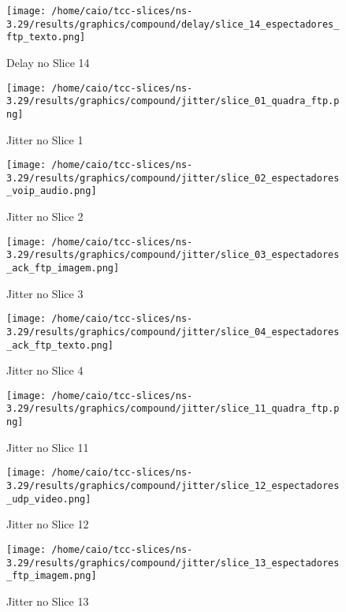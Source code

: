 \documentclass[12pt, a4paper]{article}
\begin{document}
\begin{figure}[H]
	\centering
	\texttt{[image: /home/caio/tcc-slices/ns-3.29/results/graphics/compound/delay/slice\_14\_espectadores\_ftp\_texto.png]}
	\caption{Delay no Slice 14}
	\label{delay14}
\end{figure}

\begin{figure}[H]
	\centering
	\texttt{[image: /home/caio/tcc-slices/ns-3.29/results/graphics/compound/jitter/slice\_01\_quadra\_ftp.png]}
	\caption{Jitter no Slice 1}
	\label{jitter1}
\end{figure}

\begin{figure}[H]
	\centering
	\texttt{[image: /home/caio/tcc-slices/ns-3.29/results/graphics/compound/jitter/slice\_02\_espectadores\_voip\_audio.png]}
	\caption{Jitter no Slice 2}
	\label{jitter2}
\end{figure}

\begin{figure}[H]
	\centering
	\texttt{[image: /home/caio/tcc-slices/ns-3.29/results/graphics/compound/jitter/slice\_03\_espectadores\_ack\_ftp\_imagem.png]}
	\caption{Jitter no Slice 3}
	\label{jitter3}
\end{figure}

\begin{figure}[H]
	\centering
	\texttt{[image: /home/caio/tcc-slices/ns-3.29/results/graphics/compound/jitter/slice\_04\_espectadores\_ack\_ftp\_texto.png]}
	\caption{Jitter no Slice 4}
	\label{jitter4}
\end{figure}

\begin{figure}[H]
	\centering
	\texttt{[image: /home/caio/tcc-slices/ns-3.29/results/graphics/compound/jitter/slice\_11\_quadra\_ftp.png]}
	\caption{Jitter no Slice 11}
	\label{jitter11}
\end{figure}

\begin{figure}[H]
	\centering
	\texttt{[image: /home/caio/tcc-slices/ns-3.29/results/graphics/compound/jitter/slice\_12\_espectadores\_udp\_video.png]}
	\caption{Jitter no Slice 12}
	\label{jitter12}
\end{figure}

\begin{figure}[H]
	\centering
	\texttt{[image: /home/caio/tcc-slices/ns-3.29/results/graphics/compound/jitter/slice\_13\_espectadores\_ftp\_imagem.png]}
	\caption{Jitter no Slice 13}
	\label{jitter13}
\end{figure}
\end{document}
